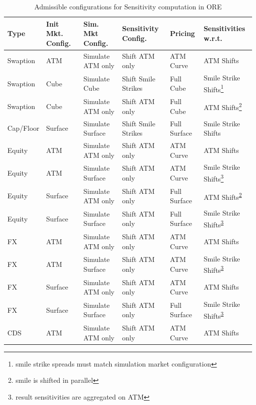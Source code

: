 \begin{table}[hbt]
  \scriptsize
  \begin{center}
    \begin{tabular}{l | l | l | l | l | l}
      \hline
      Type & Init Mkt. Config. & Sim. Mkt Config. & Sensitivity Config. & Pricing & Sensitivities w.r.t. \\
      \hline
      Swaption & ATM & Simulate ATM only & Shift ATM only & ATM Curve & ATM Shifts \\
      Swaption & Cube & Simulate Cube & Shift Smile Strikes & Full Cube & Smile Strike Shifts\footnote{smile
                                                                          strike spreads must match simulation market configuration} \\
      Swaption & Cube & Simulate ATM only & Shift ATM only & Full Cube & ATM Shifts\footnote{smile is shifted in parallel\label{sensismileparallel}} \\
      \hline
      Cap/Floor & Surface & Simulate Surface & Shift Smile Strikes & Full Surface & Smile Strike Shifts \\
      \hline
      Equity & ATM & Simulate ATM only & Shift ATM only & ATM Curve & ATM Shifts \\
      Equity & ATM & Simulate Surface & Shift ATM only & ATM Curve & Smile Strike Shifts\footnote{result sensitivities
                                                                     are aggregated on ATM\label{sensiaggatm}} \\
      Equity & Surface & Simulate ATM only & Shift ATM only & Full Surface & ATM Shifts\textsuperscript{\ref{sensismileparallel}} \\
      Equity & Surface & Simulate Surface & Shift ATM only & Full Surface & Smile Strike Shifts\textsuperscript{\ref{sensiaggatm}} \\
      \hline
      FX & ATM & Simulate ATM only & Shift ATM only & ATM Curve & ATM Shifts \\
      FX & ATM & Simulate Surface & Shift ATM only & ATM Curve & Smile Strike Shifts\textsuperscript{\ref{sensiaggatm}} \\
      FX & Surface & Simulate ATM only & Shift ATM only & ATM Curve & ATM Shifts \\
      FX & Surface & Simulate Surface & Shift ATM only & Full Surface & Smile Strike Shifts\textsuperscript{\ref{sensiaggatm}} \\
      \hline
      CDS & ATM & Simulate ATM only & Shift ATM only & ATM Curve & ATM Shifts \\
    \end{tabular}
    \caption{Admissible configurations for Sensitivity computation in ORE}
    \label{sensi_config_overview}
  \end{center}
  \end{table}

